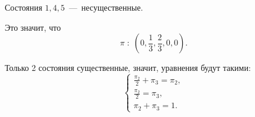 \begin{enumerate}[label=\alph*)]
Состояния $1, 4, 5$~---~несущественные.

Это значит, что
\begin{equation*}
  \pi \; : \;
  \left( 0, \frac{1}{3}, \frac{2}{3}, 0, 0 \right).
\end{equation*}

Только 2 состояния существенные, значит, уравнения будут такими:
\begin{equation*}
  \begin{cases}
    \frac{ \pi_2}{2} + \pi_3 = \pi_2, \\
    \frac{ \pi_2}{2} = \pi_3, \\
    \pi_2 + \pi_3 = 1.
  \end{cases}
\end{equation*}
\end{enumerate}
